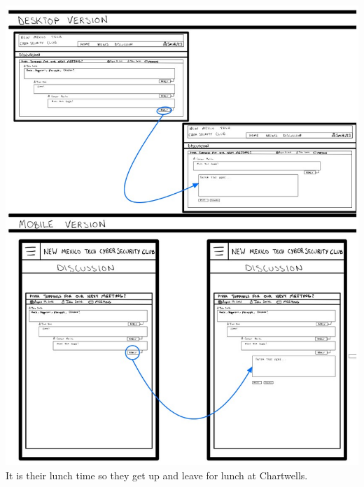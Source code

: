 \documentclass{article}
\begin{document}
\includegraphics[scale=0.60]{member_5.jpg} It is their lunch time so they get up and leave for lunch at Chartwells.
\end{document}
